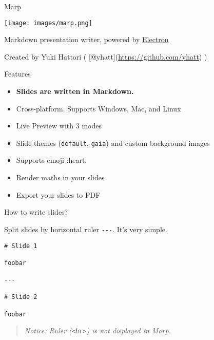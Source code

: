\documentclass[ignorenonframetext,]{beamer}
\providecommand{\tightlist}{%
  \setlength{\itemsep}{0pt}\setlength{\parskip}{0pt}}
\begin{document}
\begin{frame}{Marp}

\end{frame}

\begin{frame}{\texttt{[image: images/marp.png]}}

\begin{block}{Markdown presentation writer, powered by
\href{http://electron.atom.io/}{Electron}}

\begin{block}{Created by Yuki Hattori (
{[}@yhatt{]}(\url{https://github.com/yhatt}) )}

\end{block}

\end{block}

\end{frame}

\begin{frame}{Features}

\begin{itemize}
\tightlist
\item
  \textbf{Slides are written in Markdown.}
\item
  Cross-platform. Supports Windows, Mac, and Linux
\item
  Live Preview with 3 modes
\item
  Slide themes (\texttt{default}, \texttt{gaia}) and custom background
  images
\item
  Supports emoji :heart:
\item
  Render maths in your slides
\item
  Export your slides to PDF
\end{itemize}

\end{frame}

\begin{frame}[fragile]{How to write slides?}

Split slides by horizontal ruler \texttt{-\/-\/-}. It's very simple.

\begin{verbatim}
# Slide 1

foobar

---

# Slide 2

foobar
\end{verbatim}

\begin{quote}
\emph{Notice: Ruler (\texttt{\textless{}hr\textgreater{}}) is not
displayed in Marp.}
\end{quote}

\end{frame}
\end{document}
